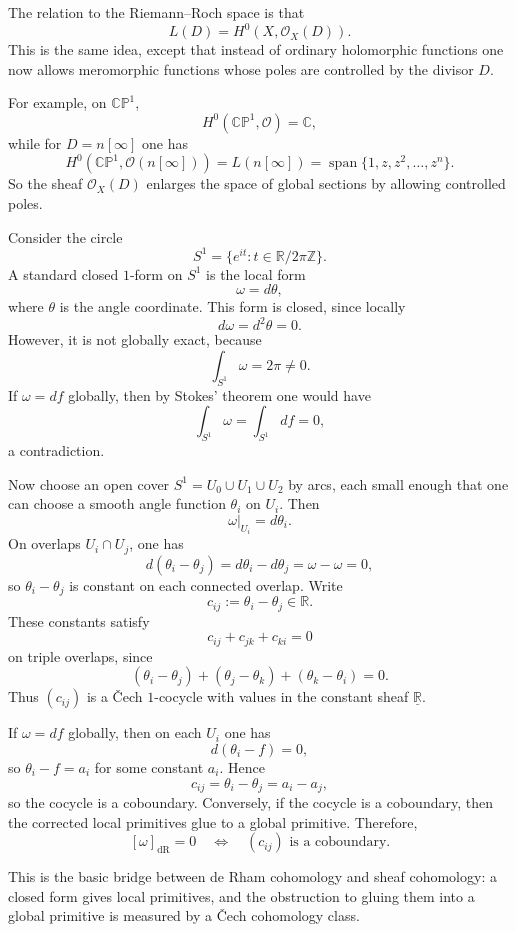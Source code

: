 \documentclass[11pt,openany]{article}
\begin{document}
The relation to the Riemann--Roch space is that
\[
L(D)=H^0(X,\mathcal O_X(D)).
\]
This is the same idea, except that instead of ordinary holomorphic functions one now allows meromorphic functions whose poles are controlled by the divisor $D$.

For example, on $\mathbb{CP}^1$,
\[
H^0(\mathbb{CP}^1,\mathcal O)=\mathbb C,
\]
while for $D=n[\infty]$ one has
\[
H^0(\mathbb{CP}^1,\mathcal O(n[\infty]))
=
L(n[\infty])
=
\operatorname{span}\{1,z,z^2,\dots,z^n\}.
\]
So the sheaf $\mathcal O_X(D)$ enlarges the space of global sections by allowing controlled poles.
\newpage

Consider the circle
\[
S^1=\{e^{it}: t\in \mathbb R/2\pi\mathbb Z\}.
\]
A standard closed $1$-form on $S^1$ is the local form
\[
\omega=d\theta,
\]
where $\theta$ is the angle coordinate. This form is closed, since locally
\[
d\omega=d^2\theta=0.
\]
However, it is not globally exact, because
\[
\int_{S^1}\omega=2\pi\neq 0.
\]
If $\omega=df$ globally, then by Stokes' theorem one would have
\[
\int_{S^1}\omega=\int_{S^1}df=0,
\]
a contradiction.

Now choose an open cover $S^1=U_0\cup U_1\cup U_2$ by arcs, each small enough that one can choose a smooth angle function $\theta_i$ on $U_i$. Then
\[
\omega|_{U_i}=d\theta_i.
\]
On overlaps $U_i\cap U_j$, one has
\[
d(\theta_i-\theta_j)=d\theta_i-d\theta_j=\omega-\omega=0,
\]
so $\theta_i-\theta_j$ is constant on each connected overlap. Write
\[
c_{ij}:=\theta_i-\theta_j\in \mathbb R.
\]
These constants satisfy
\[
c_{ij}+c_{jk}+c_{ki}=0
\]
on triple overlaps, since
\[
(\theta_i-\theta_j)+(\theta_j-\theta_k)+(\theta_k-\theta_i)=0.
\]
Thus $(c_{ij})$ is a \v{C}ech $1$-cocycle with values in the constant sheaf $\underline{\mathbb R}$.

If $\omega=df$ globally, then on each $U_i$ one has
\[
d(\theta_i-f)=0,
\]
so $\theta_i-f=a_i$ for some constant $a_i$. Hence
\[
c_{ij}=\theta_i-\theta_j=a_i-a_j,
\]
so the cocycle is a coboundary. Conversely, if the cocycle is a coboundary, then the corrected local primitives glue to a global primitive. Therefore,
\[
[\omega]_{\mathrm{dR}}=0
\quad\Longleftrightarrow\quad
(c_{ij}) \text{ is a coboundary}.
\]

This is the basic bridge between de Rham cohomology and sheaf cohomology:
a closed form gives local primitives, and the obstruction to gluing them into a global primitive is measured by a \v{C}ech cohomology class.

\vspace{40pt}
\end{document}

